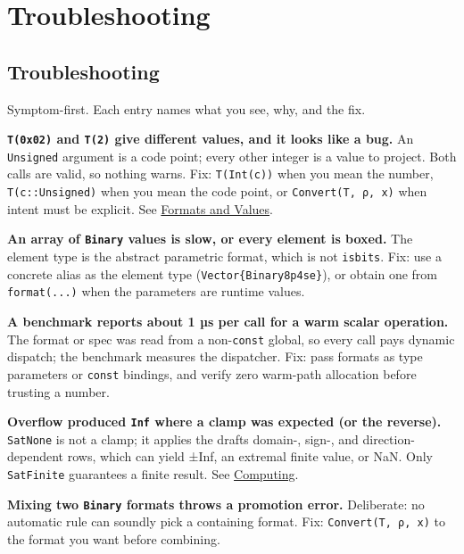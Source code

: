 \part{Troubleshooting}


\chapter{Troubleshooting}



\label{5264174653950164674}{}


Symptom-first. Each entry names what you see, why, and the fix.



\textbf{\texttt{T(0x02)} and \texttt{T(2)} give different values, and it looks like a bug.} An \texttt{Unsigned} argument is a code point; every other integer is a value to project. Both calls are valid, so nothing warns. Fix: \texttt{T(Int(c))} when you mean the number, \texttt{T(c::Unsigned)} when you mean the code point, or \texttt{Convert(T, ρ, x)} when intent must be explicit. See \href{values.md}{Formats and Values}.



\textbf{An array of \texttt{Binary} values is slow, or every element is boxed.} The element type is the abstract parametric format, which is not \texttt{isbits}. Fix: use a concrete alias as the element type (\texttt{Vector\{Binary8p4se\}}), or obtain one from \texttt{format(...)} when the parameters are runtime values.



\textbf{A benchmark reports about 1 µs per call for a warm scalar operation.} The format or spec was read from a non-\texttt{const} global, so every call pays dynamic dispatch; the benchmark measures the dispatcher. Fix: pass formats as type parameters or \texttt{const} bindings, and verify zero warm-path allocation before trusting a number.



\textbf{Overflow produced \texttt{Inf} where a clamp was expected (or the reverse).} \texttt{SatNone} is not a clamp; it applies the draft{\textquotesingle}s domain-, sign-, and direction-dependent rows, which can yield ±Inf, an extremal finite value, or NaN. Only \texttt{SatFinite} guarantees a finite result. See \href{computing.md}{Computing}.



\textbf{Mixing two \texttt{Binary} formats throws a promotion error.} Deliberate: no automatic rule can soundly pick a containing format. Fix: \texttt{Convert(T, ρ, x)} to the format you want before combining.



